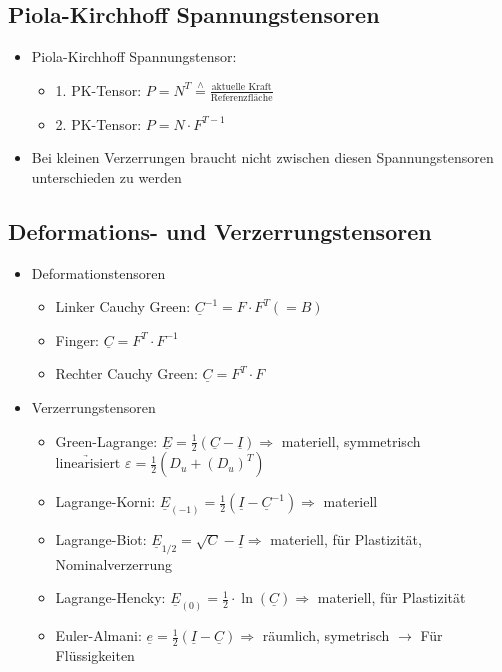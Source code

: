\documentclass[fleqn,twoside]{article}
\begin{document}
\subsection{Piola-Kirchhoff Spannungstensoren}
    \begin{itemize}
    \item Piola-Kirchhoff Spannungstensor:
	 	\begin{itemize}
	 	  \item 1. PK-Tensor: $P = N^T \overset{\wedge}{=} \frac{\text{aktuelle Kraft}}{\text{Referenzfläche}}$
                \item 2. PK-Tensor: $P= N \cdot F^{T-1}$
	 	\end{itemize}
   \item Bei kleinen Verzerrungen braucht nicht zwischen diesen Spannungstensoren unterschieden zu werden
   \end{itemize}
   
\subsection{Deformations- und Verzerrungstensoren}
\begin{itemize}
    \item Deformationstensoren
        \begin{itemize}
            \item Linker Cauchy Green: $\underline{C} ^{-1} = F \cdot F^T (=B)$
            \item Finger: $\underline{C} = F^T \cdot F^{-1}$
            \item Rechter Cauchy Green: $\underline{C} = F^T \cdot F$
        \end{itemize}
    \item Verzerrungstensoren
        \begin{itemize}
            \item Green-Lagrange: $\underline{E} = \frac12 (\underline{C} - \underline{I}) \Rightarrow$ materiell, symmetrisch \\ 
                    $\underrightarrow{\text{linearisiert}}$  $\varepsilon=\frac12 \left( D_u + (D_u)^T \right)$ 
            \item Lagrange-Korni: $\underline{E}_{(-1)} = \frac12 (\underline{I} - \underline{C}^{-1}) \Rightarrow$ materiell
            \item Lagrange-Biot: $\underline{E}_{1/2} = \sqrt{C} - \underline{I} \Rightarrow$ materiell, für Plastizität, Nominalverzerrung
            \item Lagrange-Hencky: $\underline{E}_{(0)} = \frac12 \cdot \ln(\underline{C}) \Rightarrow$ materiell, für Plastizität
            \item Euler-Almani: $\underline{e} = \frac12 (\underline{I} -\underline{C}) \Rightarrow$ räumlich, symetrisch $\rightarrow$ Für Flüssigkeiten
        \end{itemize}
\end{itemize}
\end{document}
